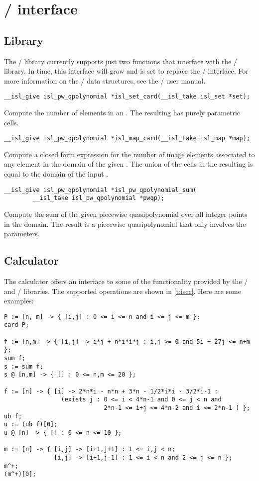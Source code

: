 \section{\protect\isl/ interface}

\subsection{Library}

The \barvinok/ library currently supports just two
functions that interface with the \isl/ library.
In time, this interface will grow and is set to replace
the \PolyLib/ interface.
For more information on the \isl/ data structures, see
the \isl/ user manual.

\begin{verbatim}
__isl_give isl_pw_qpolynomial *isl_set_card(__isl_take isl_set *set);
\end{verbatim}
Compute the number of elements in an .
The resulting  has purely parametric cells.

\begin{verbatim}
__isl_give isl_pw_qpolynomial *isl_map_card(__isl_take isl_map *map);
\end{verbatim}
Compute a closed form expression for the number of image elements
associated to any element in the domain of the given .
The union of the cells in the resulting 
is equal to the domain of the input .

\begin{verbatim}
__isl_give isl_pw_qpolynomial *isl_pw_qpolynomial_sum(
        __isl_take isl_pw_qpolynomial *pwqp);
\end{verbatim}
Compute the sum of the given piecewise quasipolynomial over
all integer points in the domain.  The result is a piecewise
quasipolynomial that only involves the parameters.

\subsection{Calculator}

The  calculator offers an interface to some
of the functionality provided by the \isl/ and \barvinok/
libraries.
The supported operations are shown in \autoref{t:iscc}.
Here are some examples:
\begin{verbatim}
P := [n, m] -> { [i,j] : 0 <= i <= n and i <= j <= m };
card P;

f := [n,m] -> { [i,j] -> i*j + n*i*i*j : i,j >= 0 and 5i + 27j <= n+m };
sum f;
s := sum f;
s @ [n,m] -> { [] : 0 <= n,m <= 20 };

f := [n] -> { [i] -> 2*n*i - n*n + 3*n - 1/2*i*i - 3/2*i-1 :
                (exists j : 0 <= i < 4*n-1 and 0 <= j < n and
                            2*n-1 <= i+j <= 4*n-2 and i <= 2*n-1 ) };
ub f;
u := (ub f)[0];
u @ [n] -> { [] : 0 <= n <= 10 };

m := [n] -> { [i,j] -> [i+1,j+1] : 1 <= i,j < n;
              [i,j] -> [i+1,j-1] : 1 <= i < n and 2 <= j <= n };
m^+;
(m^+)[0];
\end{verbatim}

